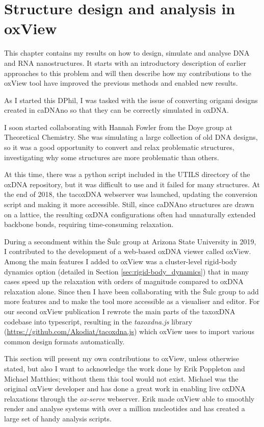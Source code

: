\chapter{\label{ch:oxview}Structure design and analysis in oxView}

\minitoc

This chapter contains my results on how to design, simulate and analyse DNA and RNA nanostructures. It starts with an introductory description of earlier approaches to this problem and will then describe how my contributions to the oxView tool have improved the previous methods and enabled new results.

As I started this DPhil, I was tasked with the issue of converting origami designs created in caDNAno so that they can be correctly simulated in oxDNA.

I soon started collaborating with Hannah Fowler from the Doye group at Theoretical Chemistry. She was simulating a large collection of old DNA designs, so it was a good opportunity to convert and relax problematic structures, investigating why some structures are more problematic than others.

At this time, there was a python script included in the UTILS directory of the oxDNA repository, but it was difficult to use and it failed for many structures. At the end of 2018, the tacoxDNA webserver \cite{suma2019tacoxdna} was launched, updating the conversion script and making it more accessible. Still, since caDNAno structures are drawn on a lattice, the resulting oxDNA configurations often had unnaturally extended backbone bonds, requiring time-consuming relaxation.

During a secondment within the {\v{S}}ulc group at Arizona State University in 2019, I contributed to the development of a web-based oxDNA viewer called oxView\cite{poppleton2020design}. Among the main features I added to oxView was a cluster-level rigid-body dynamics option (detailed in Section \ref{sec:rigid-body_dynamics}) that in many cases speed up the relaxation with orders of magnitude compared to oxDNA relaxation alone. Since then I have been collaborating with the {\v{S}}ulc group to add more features and to make the tool more accessible as a visualiser and editor. For our second oxView publication I rewrote the main parts of the taxoxDNA codebase into typescript, resulting in the \emph{taxoxdna.js} library (\url{https://github.com/Akodiat/tacoxdna.js}) which oxView uses to import various common design formats automatically.

This section will present my own contributions to oxView, unless otherwise stated, but also I want to acknowledge the work done by Erik Poppleton and Michael Matthies; without them this tool would not exist. Michael was the original oxView developer and has done a great work in enabling live oxDNA relaxations through the \emph{ox-serve} webserver. Erik made oxView able to smoothly render and analyse systems with over a million nucleotides and has created a large set of handy analysis scripts.

